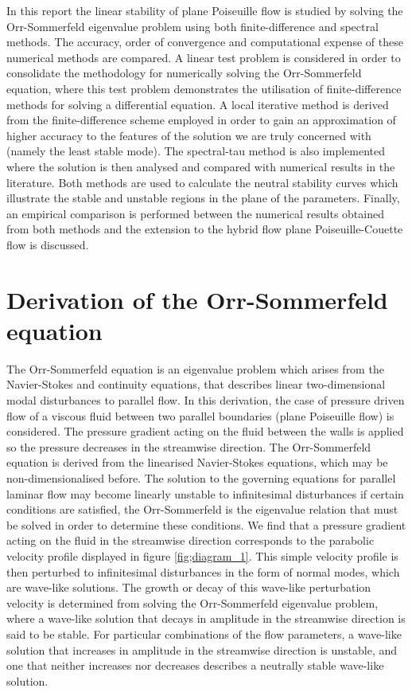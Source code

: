 \documentclass[a4paper, 12pt, twoside, openright]{article}
\numberwithin{equation}{section}
\begin{document}
In this report the linear stability of plane Poiseuille flow is studied by solving the Orr-Sommerfeld eigenvalue problem using both finite-difference and spectral methods. The accuracy, order of convergence and computational expense of these numerical methods are compared. A linear test problem is considered in order to consolidate the methodology for numerically solving the Orr-Sommerfeld equation, where this test problem demonstrates the utilisation of finite-difference methods for solving a differential equation. A local iterative method is derived from the finite-difference scheme employed in order to gain an approximation of higher accuracy to the features of the solution we are truly concerned with (namely the least stable mode). The spectral-tau method is also implemented where the solution is then analysed and compared with numerical results in the literature. Both methods are used to calculate the neutral stability curves which illustrate the stable and unstable regions in the plane of the parameters. Finally, an empirical comparison is performed between the numerical results obtained from both methods and the extension to the hybrid flow plane Poiseuille-Couette flow is discussed.  %


%
%
%
%
\newpage
\section{Derivation of the Orr-Sommerfeld equation} 

The Orr-Sommerfeld equation is an eigenvalue problem which arises from the Navier-Stokes and continuity equations, that describes linear two-dimensional modal disturbances to parallel flow. In this derivation, the case of pressure driven flow of a viscous fluid between two parallel boundaries (plane Poiseuille flow) is considered. The pressure gradient acting on the fluid between the walls is applied so the pressure decreases in the streamwise direction. The Orr-Sommerfeld equation is derived from the linearised Navier-Stokes equations, which may be non-dimensionalised before. The solution to the governing equations for parallel laminar flow may become linearly unstable to infinitesimal disturbances if certain conditions are satisfied, the Orr-Sommerfeld is the eigenvalue relation that must be solved in order to determine these conditions. We find that a pressure gradient acting on the fluid in the streamwise direction corresponds to the parabolic velocity profile displayed in figure \ref{fig;diagram_1}. This simple velocity profile is then perturbed to infinitesimal disturbances in the form of normal modes, which are wave-like solutions. The growth or decay of this wave-like perturbation velocity is determined from solving the Orr-Sommerfeld eigenvalue problem, where a wave-like solution that decays in amplitude in the streamwise direction is said to be stable. For particular combinations of the flow parameters, a wave-like solution that increases in amplitude in the streamwise direction is unstable, and one that neither increases nor decreases describes a neutrally stable wave-like solution.   
\end{document}
